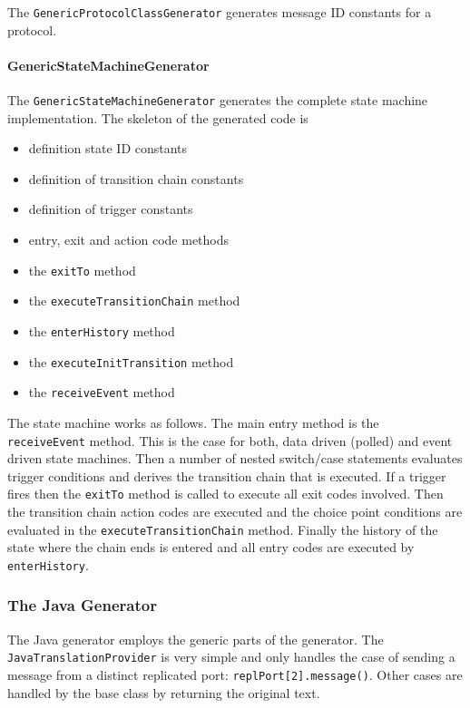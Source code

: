 The \texttt{GenericProtocolClassGenerator} generates message ID constants for a protocol.

\paragraph*{GenericStateMachineGenerator}

\begin{flushleft}The \texttt{GenericStateMachineGenerator} generates the complete state machine 
implementation. The skeleton of the generated code is\end{flushleft}

\begin{itemize}
\item definition state ID constants
\item definition of transition chain constants
\item definition of trigger constants
\item entry, exit and action code methods
\item the \texttt{exitTo} method 
\item the \texttt{executeTransitionChain} method
\item the \texttt{enterHistory} method
\item the \texttt{executeInitTransition} method
\item the \texttt{receiveEvent} method
\end{itemize}

The state machine works as follows. The main entry method is the \\ \texttt{receiveEvent} method. This is 
the case for both, data driven (polled) and event driven state machines. Then a number of nested 
switch/case statements evaluates trigger conditions and derives the transition chain that is executed. If 
a trigger fires then the \texttt{exitTo} method is called to execute all exit codes involved. Then the 
transition chain action codes are executed and the choice point conditions are evaluated in the 
\texttt{executeTransitionChain} method. Finally the history of the state where the chain ends is entered 
and all entry codes are executed by \texttt{enterHistory}.

\subsubsection*{The Java Generator}

The Java generator employs the generic parts of the generator. The \texttt{JavaTranslationProvider} is 
very simple and only handles the case of sending a message from a distinct replicated port: 
\texttt{replPort[2].message()}. Other cases are handled by the base class by returning the original text.

